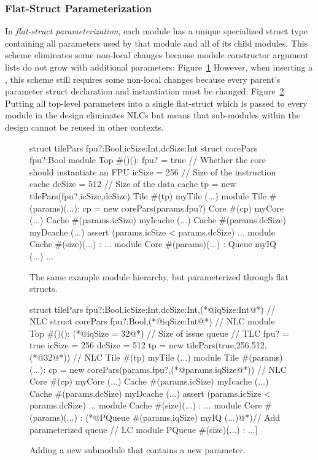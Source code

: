 \subsubsection{Flat-Struct Parameterization}

In \emph{flat-struct parameterization}, each module has a unique specialized struct type containing all parameters used by that module and all of its child modules. This scheme eliminates some non-local changes because module constructor argument lists do not grow with additional parameters:
Figure~\ref{fig:flatstruct}
However, when inserting a , this scheme still requires some non-local changes because every parent's parameter struct declaration and instantiation must be changed:
Figure~\ref{fig:flatstruct-delta}
Putting all top-level parameters into a single flat-struct which is passed to every module in the design
eliminates NLCs but means that sub-modules within the design cannot be reused in other contexts.

\begin{figure}
\centering
\begin{phdl}
struct tilePars {fpu?:Bool,icSize:Int,dcSize:Int}
struct corePars {fpu?:Bool}
module Top #()():
  fpu? = true    // Whether the core should instantiate an FPU
  icSize = 256   // Size of the instruction cache
  dcSize = 512   // Size of the data cache
  tp = new tilePars(fpu?,icSize,dcSize)
  Tile #(tp) myTile (...)
module Tile #(params)(...):
  cp = new corePars(params.fpu?)
  Core  #(cp) myCore (...)
  Cache #(params.icSize) myIcache (...)
  Cache #(params.dcSize) myDcache (...)
  assert (params.icSize < params.dcSize) ...
module Cache #(size)(...) : ...
module Core #(params)(...) :
  Queue myIQ (...) ...
\end{phdl} 
\caption{The same example module hierarchy, but parameterized through flat structs.}
\label{fig:flatstruct}
\end{figure}

\begin{figure}
\centering
\begin{phdl}
struct tilePars {fpu?:Bool,icSize:Int,dcSize:Int,(*@\textcolor[rgb]{1,0,0}{iqSize:Int}@*)}     // NLC
struct corePars {fpu?:Bool,(*@\textcolor[rgb]{1,0,0}{iqSize:Int}@*)}                           // NLC
module Top #()():
  (*@\textcolor[rgb]{1,0,0}{iqSize = 32}@*)  // Size of issue queue                            // TLC
  fpu? = true
  icSize = 256
  dcSize = 512
  tp = new tilePars(true,256,512,(*@\textcolor[rgb]{1,0,0}{32}@*))                             // NLC
  Tile #(tp) myTile (...)
module Tile #(params)(...):
  cp = new corePars(params.fpu?,(*@\textcolor[rgb]{1,0,0}{params.iqSize}@*))                   // NLC
  Core  #(cp)  myCore   (...)
  Cache #(params.icSize) myIcache (...)
  Cache #(params.dcSize) myDcache (...)
  assert (params.icSize < params.dcSize) ...
module Cache #(size)(...) : ...
module Core #(params)(...) :
    (*@\textcolor[rgb]{1,0,0}{PQueue \#(params.iqSize) myIQ (...)}@*)// Add parameterized queue // LC
module PQueue #(size)(...) : ...]
\end{phdl} 
\caption{Adding a new submodule that contains a new parameter.}
\label{fig:flatstruct-delta}
\end{figure}

